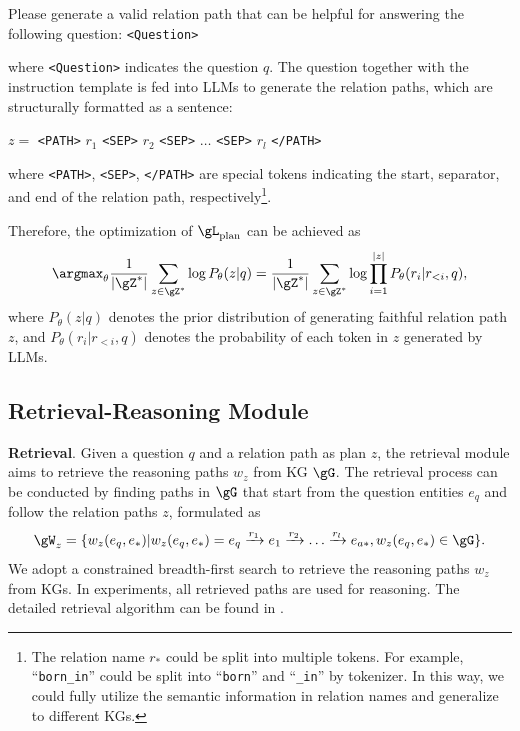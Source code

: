 \begin{minipage}{0.99\columnwidth}
    \centering
    \begin{tcolorbox}
        \small
        Please generate a valid relation path that can be helpful for answering the following question: \texttt{<Question>}
    \end{tcolorbox}
    \vspace{1mm}
\end{minipage}
where \texttt{<Question>} indicates the question $q$. The question together with the instruction template is fed into LLMs to generate the relation paths, which are structurally formatted as a sentence:

\begin{minipage}{0.99\columnwidth}
    \centering
    $z=$ \texttt{<PATH>} $r_1$ \texttt{<SEP>}  $r_2$ \texttt{<SEP>} $\dots$ \texttt{<SEP>} $r_l$ \texttt{</PATH>}
    \vspace{1mm}
\end{minipage}
where \texttt{<PATH>}, \texttt{<SEP>}, \texttt{</PATH>} are special tokens indicating the start, separator, and end of the relation path, respectively\footnote{The relation name $r_*$ could be split into multiple tokens. For example, ``\texttt{born\_in}'' could be split into ``\texttt{born}'' and ``\texttt{\_in}'' by tokenizer. In this way,  we could fully utilize the semantic information in relation names and generalize to different KGs.}. 

Therefore, the optimization of $\gL_{\text{plan}}$ can be achieved as
\begin{equation}
    \setlength\abovedisplayskip{1pt}%
    \setlength\belowdisplayskip{1pt}
    \argmax_\theta \RE{\frac{1}{|\gZ^*|}}\sum_{z\in \RE{\gZ^*}} \log P_\theta(z|q)= \RE{\frac{1}{|\gZ^*|}} \sum_{z\in \RE{\gZ^*}}\log \prod_{i=1}^{|z|}P_\theta(r_i|r_{<i},q),
\end{equation}
where $P_\theta(z|q)$ denotes the prior distribution of generating faithful relation path $z$, and $P_\theta(r_i|r_{<i},q)$ denotes the probability of each token in $z$ generated by LLMs.

\subsection{Retrieval-Reasoning Module}

\noindent\textbf{Retrieval}. Given a question $q$ and a relation path as plan $z$, the retrieval module aims to retrieve the reasoning paths $w_z$ from KG $\gG$. The retrieval process can be conducted by finding paths in $\gG$ that start from the question entities $e_q$ and follow the relation paths $z$, formulated as
\begin{equation}
    \setlength\abovedisplayskip{1pt}%
    \setlength\belowdisplayskip{1pt}
    \gW_z=\{w_z(e_q,e_*)|w_z(e_q,e_*)=e_q\xrightarrow{r_1}e_1\xrightarrow{r_2}\ldots\xrightarrow{r_l}e_{a*}, w_z(e_q,e_*)\in\gG\}.
\end{equation}
We adopt a constrained breadth-first search to retrieve the reasoning paths $w_z$ from KGs. In experiments, all retrieved paths are used for reasoning. The detailed retrieval algorithm can be found in .

